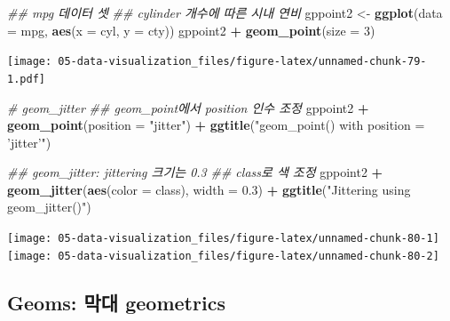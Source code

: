 \documentclass[
  11pt,
]{krantz}
\newenvironment{Shaded}{\begin{snugshade}}{\end{snugshade}}
\newcommand{\CommentTok}[1]{\textcolor[rgb]{0.37,0.37,0.37}{\textit{#1}}}
\newcommand{\DataTypeTok}[1]{\textcolor[rgb]{0.27,0.27,0.27}{#1}}
\newcommand{\DecValTok}[1]{\textcolor[rgb]{0.06,0.06,0.06}{#1}}
\newcommand{\FloatTok}[1]{\textcolor[rgb]{0.06,0.06,0.06}{#1}}
\newcommand{\KeywordTok}[1]{\textcolor[rgb]{0.27,0.27,0.27}{\textbf{#1}}}
\newcommand{\NormalTok}[1]{#1}
\newcommand{\OperatorTok}[1]{\textcolor[rgb]{0.43,0.43,0.43}{\textbf{#1}}}
\newcommand{\StringTok}[1]{\textcolor[rgb]{0.5,0.5,0.5}{#1}}
\begin{document}
\begin{Shaded}
\begin{Highlighting}[]
\CommentTok{## mpg 데이터 셋}
\CommentTok{## cylinder 개수에 따른 시내 연비}
\NormalTok{gppoint2 <-}\StringTok{ }\KeywordTok{ggplot}\NormalTok{(}\DataTypeTok{data =}\NormalTok{ mpg, }
                   \KeywordTok{aes}\NormalTok{(}\DataTypeTok{x =}\NormalTok{ cyl, }\DataTypeTok{y =}\NormalTok{ cty))}
\NormalTok{gppoint2 }\OperatorTok{+}\StringTok{ }\KeywordTok{geom_point}\NormalTok{(}\DataTypeTok{size =} \DecValTok{3}\NormalTok{)}
\end{Highlighting}
\end{Shaded}

\texttt{[image: 05-data-visualization\_files/figure-latex/unnamed-chunk-79-1.pdf]}

\normalsize

\footnotesize

\begin{Shaded}
\begin{Highlighting}[]
\CommentTok{# geom_jitter}
\CommentTok{## geom_point에서 position 인수 조정}
\NormalTok{gppoint2 }\OperatorTok{+}\StringTok{ }
\StringTok{  }\KeywordTok{geom_point}\NormalTok{(}\DataTypeTok{position =} \StringTok{"jitter"}\NormalTok{) }\OperatorTok{+}\StringTok{ }
\StringTok{  }\KeywordTok{ggtitle}\NormalTok{(}\StringTok{"geom_point() with position = 'jitter'"}\NormalTok{)}

\CommentTok{## geom_jitter: jittering 크기는 0.3}
\CommentTok{## class로 색 조정}
\NormalTok{gppoint2 }\OperatorTok{+}\StringTok{ }
\StringTok{  }\KeywordTok{geom_jitter}\NormalTok{(}\KeywordTok{aes}\NormalTok{(}\DataTypeTok{color =}\NormalTok{ class), }
              \DataTypeTok{width =} \FloatTok{0.3}\NormalTok{) }\OperatorTok{+}\StringTok{ }
\StringTok{  }\KeywordTok{ggtitle}\NormalTok{(}\StringTok{"Jittering using geom_jitter()"}\NormalTok{)}
\end{Highlighting}
\end{Shaded}

\texttt{[image: 05-data-visualization\_files/figure-latex/unnamed-chunk-80-1]} \texttt{[image: 05-data-visualization\_files/figure-latex/unnamed-chunk-80-2]}

\normalsize

\hypertarget{geom-bars}{%
\subsection{Geoms: 막대 geometrics}\label{geom-bars}}
\end{document}
